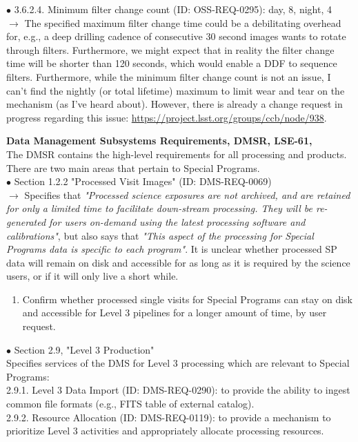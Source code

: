 \documentclass[DM,lsstdraft,toc]{lsstdoc}
\begin{document}
$\bullet$ 3.6.2.4. Minimum filter change count (ID: OSS-REQ-0295): day, 8, night, 4 \\
$\rightarrow$ The specified maximum filter change time could be a debilitating overhead for, e.g., a deep drilling cadence of consecutive 30 second images wants to rotate through filters. Furthermore, we might expect that in reality the filter change time will be shorter than 120 seconds, which would enable a DDF to sequence filters. Furthermore, while the minimum filter change count is not an issue, I can't find the nightly (or total lifetime) maximum to limit wear and tear on the mechanism (as I've heard about). However, there is already a change request in progress regarding this issue: \url{https://project.lsst.org/groups/ccb/node/938}.

\noindent \textbf{Data Management Subsystems Requirements, DMSR, LSE-61, \cite{LSE-61}} \\
The DMSR contains the high-level requirements for all processing and products. There are two main areas that pertain to Special Programs. \\
$\bullet$ Section 1.2.2 "Processed Visit Images" (ID: DMS-REQ-0069)\\
$\rightarrow$ Specifies that {\it "Processed science exposures are not archived, and are retained for only a limited time to facilitate down-stream processing. They will be re-generated for users on-demand using the latest processing software and calibrations"}, but also says that {\it "This aspect of the processing for Special Programs data is specific to each program"}. It is unclear whether processed SP data will remain on disk and accessible for as long as it is required by the science users, or if it will only live a short while.
\begin{enumerate}[topsep=-10pt,label= \textbf{Concern \Roman*.},resume] \item \label{C6} Confirm whether processed single visits for Special Programs can stay on disk and accessible for Level 3 pipelines for a longer amount of time, by user request. \end{enumerate}
$\bullet$ Section 2.9, "Level 3 Production" \\
Specifies services of the DMS for Level 3 processing which are relevant to Special Programs: \\
2.9.1. Level 3 Data Import (ID: DMS-REQ-0290): to provide the ability to ingest common file formats (e.g., FITS table of external catalog). \\
2.9.2. Resource Allocation (ID: DMS-REQ-0119): to provide a mechanism to prioritize Level 3 activities and appropriately allocate processing resources. \\
\end{document}
